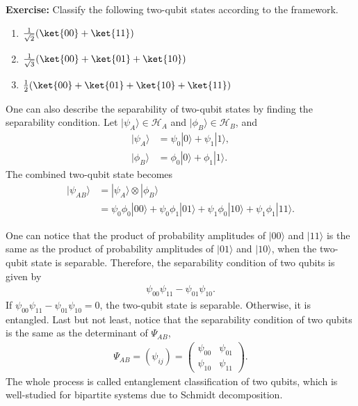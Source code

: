 \documentclass{beamer}
\begin{document}
\begin{frame}
\justify
\textbf{Exercise:} Classify the following two-qubit states according to the framework.
\begin{enumerate}
\item $\frac{1}{\sqrt{2}} (\ket{00} + \ket{11})$
\item $\frac{1}{\sqrt{3}} (\ket{00} + \ket{01} + \ket{10})$
\item $\frac{1}{2} (\ket{00} + \ket{01} + \ket{10} + \ket{11})$
\end{enumerate}
\vfill
One can also describe the separability of two-qubit states by finding the separability condition. Let $|\psi_A\rangle \in \mathcal{H}_A$ and $|\phi_B\rangle \in \mathcal{H}_B$, and
\begin{align}
|\psi_A\rangle & = \psi_0 |0\rangle + \psi_1 |1\rangle, \\
|\phi_B\rangle & = \phi_0 |0\rangle + \phi_1 |1\rangle.
\end{align}
\vfill
The combined two-qubit state becomes
\begin{align}
|\psi_{AB}\rangle & = |\psi_A\rangle \otimes |\phi_B\rangle \nonumber \\
& = \psi_0 \phi_0 |00\rangle + \psi_0 \phi_1 |01\rangle + \psi_1 \phi_0 |10\rangle + \psi_1 \phi_1 |11\rangle.
\end{align}
\end{frame}

\begin{frame}
\justify
One can notice that the product of probability amplitudes of $|00\rangle$ and $|11\rangle$ is the same as the product of probability amplitudes of $|01\rangle$ and $|10\rangle$, when the two-qubit state is separable.
\vfill
Therefore, the separability condition of two qubits is given by
\begin{align}
\psi_{00} \psi_{11} - \psi_{01} \psi_{10}.
\end{align}
\vfill
If $\psi_{00} \psi_{11} - \psi_{01} \psi_{10} = 0$, the two-qubit state is separable. Otherwise, it is entangled.
\vfill
Last but not least, notice that the separability condition of two qubits is the same as the determinant of $\Psi_{AB}$,
\begin{align}
\Psi_{AB} = (\psi_{ij}) = \begin{pmatrix}
\psi_{00} & \psi_{01} \\ \psi_{10} & \psi_{11}
\end{pmatrix}.
\end{align}
\vfill
The whole process is called entanglement classification of two qubits, which is well-studied for bipartite systems due to Schmidt decomposition.
\end{frame}
\end{document}
